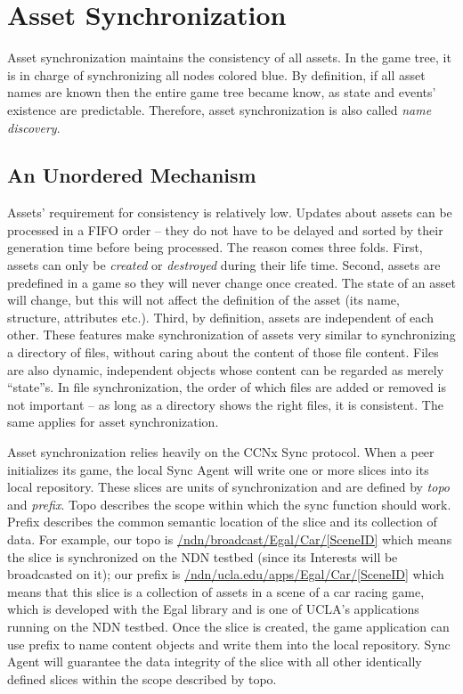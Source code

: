 \section{Asset Synchronization}
\label{assetsync}

Asset synchronization maintains the consistency of all assets. In the game tree, it is in charge of synchronizing all nodes colored blue. By definition, if all asset names are known then the entire game tree became know, as state and events' existence are predictable. Therefore, asset synchronization is also called \emph{name discovery}.

\subsection{An Unordered Mechanism}

Assets' requirement for consistency is relatively low. Updates about assets can be processed in a FIFO order -- they do not have to be delayed and sorted by their generation time before being processed. The reason comes three folds. First, assets can only be \emph{created} or \emph{destroyed} during their life time. Second, assets are predefined in a game so they will never change once created. The state of an asset will change, but this will not affect the definition of the asset (its name, structure, attributes etc.). Third, by definition, assets are independent of each other. These features make synchronization of assets very similar to synchronizing a directory of files, without caring about the content of those file content.  Files are also dynamic, independent objects whose content can be regarded as merely ``state''s. In file synchronization, the order of which files are added or removed is not important -- as long as a directory shows the right files, it is consistent. The same applies for asset synchronization.

Asset synchronization relies heavily on the CCNx Sync protocol. When a peer initializes its game, the local Sync Agent will write one or more slices into its local repository. These slices are units of synchronization and are defined by \emph{topo} and \emph{prefix}. Topo describes the scope within which the sync function should work. Prefix describes the common semantic location of the slice and its collection of data. For example, our topo is \url{/ndn/broadcast/Egal/Car/[SceneID]} which means the slice is synchronized on the NDN testbed (since its Interests will be broadcasted on it); our prefix is \url{/ndn/ucla.edu/apps/Egal/Car/[SceneID]} which means that this slice is a collection of assets in a scene of a car racing game, which is developed with the Egal library and is one of UCLA's applications running on the NDN testbed. Once the slice is created, the game application can use prefix to name content objects and write them into the local repository. Sync Agent will guarantee the data integrity of the slice with all other identically defined slices within the scope described by topo.

